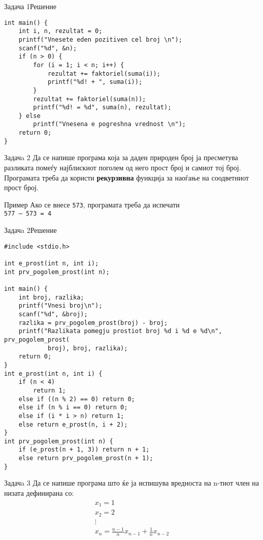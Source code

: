 \begin{frame}[fragile]{Задача 1}{Решение}
\begin{lstlisting}
int main() {
    int i, n, rezultat = 0;
    printf("Vnesete eden pozitiven cel broj \n");
    scanf("%d", &n);
    if (n > 0) {
        for (i = 1; i < n; i++) {
            rezultat += faktoriel(suma(i));
            printf("%d! + ", suma(i));
        }
        rezultat += faktoriel(suma(n));
        printf("%d! = %d", suma(n), rezultat);
    } else
        printf("Vnesena e pogreshna vrednost \n");
    return 0;
}
\end{lstlisting}
\end{frame}


\begin{frame}{Задачa 2}
Да се напише програма која за даден природен број ја пресметува разликата помеѓу
најблискиот поголем од него прост број и самиот тој број. Програмата треба да
користи \textbf{рекурзивна} функција за наоѓање на соодветниот прост број.
\begin{exampleblock}{Пример}
Ако се внесе \texttt{573}, програмата треба да испечати\\
\texttt{577 – 573 = 4}
\end{exampleblock}
\end{frame}

\begin{frame}[fragile]{Задачa 2}{Решение} 
\begin{lstlisting}
#include <stdio.h>

int e_prost(int n, int i);
int prv_pogolem_prost(int n);

int main() {
    int broj, razlika;
    printf("Vnesi broj\n");
    scanf("%d", &broj);
    razlika = prv_pogolem_prost(broj) - broj;
    printf("Razlikata pomegju prostiot broj %d i %d e %d\n", prv_pogolem_prost(
            broj), broj, razlika);
    return 0;
}
int e_prost(int n, int i) {
    if (n < 4)
        return 1;
    else if ((n % 2) == 0) return 0;
    else if (n % i == 0) return 0;
    else if (i * i > n) return 1;
    else return e_prost(n, i + 2);
}
int prv_pogolem_prost(int n) {
    if (e_prost(n + 1, 3)) return n + 1;
    else return prv_pogolem_prost(n + 1);
}
\end{lstlisting}
\end{frame}

\begin{frame}{Задачa 3}
Да се напише програма што ќе ја испишува вредноста на n-тиот член на низата дефинирана со:
\[
   \begin{array}{l}
   x_1 = 1\\
   x_2 = 2\\ 
   \vdots\\
   x_n = \frac{n - 1}{n}x_{n - 1} + \frac{1}{n}x_{n - 2}
   \end{array}
\]
\end{frame}


